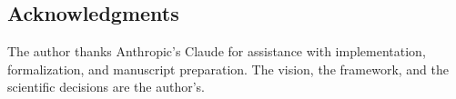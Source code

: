 \documentclass[10pt]{article}
\theoremstyle{definition}
\theoremstyle{plain}
\begin{document}
\subsection*{Acknowledgments}

The author thanks Anthropic's Claude for assistance with implementation, formalization, and manuscript preparation. The vision, the framework, and the scientific decisions are the author's.


\setlength{\bibsep}{2.5pt}
{\footnotesize
}
\end{document}
